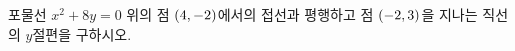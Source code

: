 포물선 $x^2+8y=0$ 위의 점 $(4{,}\mkern3mu\mathopen{}-2)$에서의 접선과 평행하고 점 $(-2{,}\mkern3mu\mathopen{}3)$을 지나는 직선의 $y$절편을 구하시오.
